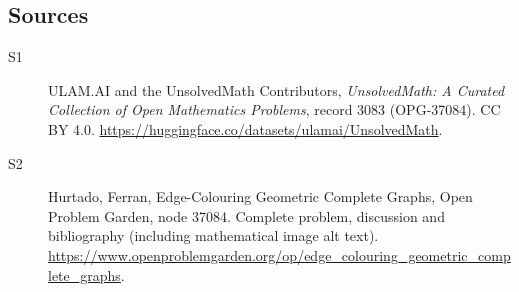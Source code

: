 \documentclass[11pt]{book}
\begin{document}
\subsection{Sources}
\begin{description}
\item[\hypertarget{source:3083:1}{S1}] ULAM.AI and the UnsolvedMath Contributors, \emph{UnsolvedMath: A Curated Collection of Open Mathematics Problems}, record 3083 (OPG-37084). CC BY 4.0. \url{https://huggingface.co/datasets/ulamai/UnsolvedMath}.
\item[\hypertarget{source:3083:2}{S2}] Hurtado, Ferran, Edge-Colouring Geometric Complete Graphs, Open Problem Garden, node 37084. Complete problem, discussion and bibliography (including mathematical image alt text). \url{https://www.openproblemgarden.org/op/edge_colouring_geometric_complete_graphs}.
\end{description}
\label{end:3083}
\end{document}
